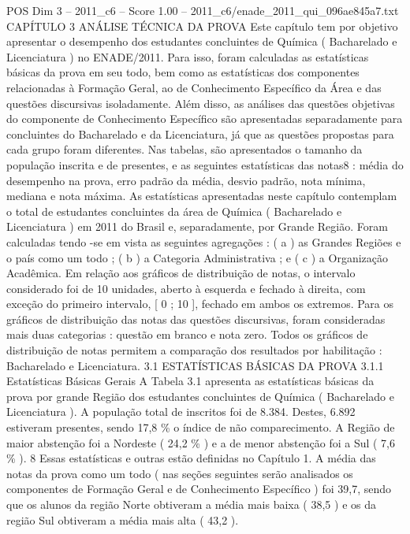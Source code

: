 \begin{textsample}{POS Dim 3 – 2011\_c6 – Score 1.00 – 2011\_c6/enade\_2011\_qui\_096ae845a7.txt}  \label{ex:f3_pos_210}
CAPÍTULO 3 ANÁLISE TÉCNICA DA PROVA Este capítulo tem por objetivo apresentar o desempenho dos estudantes concluintes de Química ( Bacharelado e Licenciatura ) no ENADE/2011.
Para isso, foram calculadas as estatísticas básicas da prova em seu todo, bem como as estatísticas dos componentes relacionadas à Formação Geral, ao de Conhecimento Específico da Área e das questões discursivas isoladamente.
Além disso, as análises das questões objetivas do componente de Conhecimento Específico são apresentadas separadamente para concluintes do Bacharelado e da Licenciatura, já que as questões propostas para cada grupo foram diferentes.
Nas tabelas, são apresentados o tamanho da população inscrita e de presentes, e as seguintes estatísticas das notas8 : média do desempenho na prova, erro padrão da média, desvio padrão, nota mínima, mediana e nota máxima.
As estatísticas apresentadas neste capítulo contemplam o total de estudantes concluintes da área de Química ( Bacharelado e Licenciatura ) em 2011 do Brasil e, separadamente, por Grande Região.
Foram calculadas tendo -se em vista as seguintes agregações : ( a ) as Grandes Regiões e o país como um todo ; ( b ) a Categoria Administrativa ; e ( c ) a Organização Acadêmica.
Em relação aos gráficos de distribuição de notas, o intervalo considerado foi de 10 unidades, aberto à esquerda e fechado à direita, com exceção do primeiro intervalo, [ 0 ; 10 ], fechado em ambos os extremos.
Para os gráficos de distribuição das notas das questões discursivas, foram consideradas mais duas categorias : questão em branco e nota zero.
Todos os gráficos de distribuição de notas permitem a comparação dos resultados por habilitação : Bacharelado e Licenciatura. 3.1 ESTATÍSTICAS BÁSICAS DA PROVA 3.1.1 Estatísticas Básicas Gerais A Tabela 3.1 apresenta as estatísticas básicas da prova por grande Região dos estudantes concluintes de Química ( Bacharelado e Licenciatura ).
A população total de inscritos foi de 8.384.
Destes, 6.892 estiveram presentes, sendo 17,8 \% o índice de não comparecimento.
A Região de maior abstenção foi a Nordeste ( 24,2 \% ) e a de menor abstenção foi a Sul ( 7,6 \% ). 8 Essas estatísticas e outras estão definidas no Capítulo 1.
A média das notas da prova como um todo ( nas seções seguintes serão analisados os componentes de Formação Geral e de Conhecimento Específico ) foi 39,7, sendo que os alunos da região Norte obtiveram a média mais baixa ( 38,5 ) e os da região Sul obtiveram a média mais alta ( 43,2 ).

\end{textsample}
